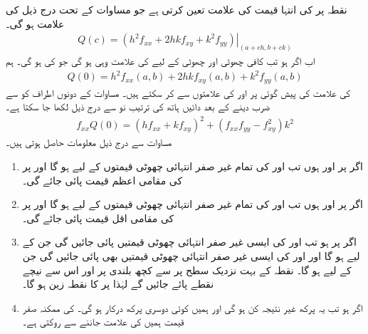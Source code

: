 نقطہ  پر  کی انتہا قیمت    کی علامت تعین کرتی ہے جو مساوات  کے تحت درج ذیل کی علامت ہو گی۔
\begin{align*}
Q(c)=\left. (h^2f_{xx}+2hkf_{xy}+k^2f_{yy})\right\vert_{(a+ch,b+ck)}
\end{align*}
اب اگر  ہو تب  کافی چھوٹی  اور  چھوٹی  کے لیے  کی علامت  وہی ہو گی جو  کی ہو گی۔ ہم
\begin{align}\label{مساوات_کثیرالمتغیر_ٹیلر_ت}
Q(0)=h^2f_{xx}(a,b)+2hkf_{xy}(a,b)+k^2f_{yy}(a,b)
\end{align}
کی علامت  کی پیش گوئی   پر  اور  کی علامتوں سے کر سکتے ہیں۔ مساوات  کے دونوں اطراف  کو  سے ضرب دینے کے بعد دائیں ہاتھ کی ترتیب نو سے درج ذیل لکھا جا سکتا ہے۔
\begin{align}\label{مساوات_کثیرالمتغیر_ٹیلر_ٹ}
f_{xx}Q(0)=(hf_{xx}+kf_{xy})^2+(f_{xx}f_{yy}-f_{xy}^2)k^2
\end{align}
مساوات  سے درج ذیل معلومات حاصل ہوتی ہیں۔
\begin{enumerate}[1.]
\item
اگر  پر  اور  ہوں تب  اور  کی تمام غیر صفر  انتہائی چھوٹی قیمتوں کے لیے    ہو گا  اور  پر  کی مقامی اعظم قیمت پائی جائے گی۔
\item
 اگر  پر  اور  ہوں تب  اور  کی تمام غیر صفر  انتہائی چھوٹی قیمتوں کے لیے    ہو گا  اور  پر  کی مقامی اقل   قیمت پائی جائے گی۔
\item
اگر  پر  ہو تب   اور  کی ایسی  غیر صفر انتہائی چھوٹی قیمتیں پائی جائیں گی جن کے لیے  ہو گا  اور    اور  کی ایسی  غیر صفر انتہائی چھوٹی قیمتیں بھی  پائی جائیں گی جن کے لیے  ہو گا۔ نقطہ  کے بہت نزدیک سطح  پر    سے  کچھ بلندی پر  اور اس سے نیچے نقطے پائے جائیں گے لہٰذا  پر  کا نقطہ زین ہو گا۔
\item
اگر  ہو تب یہ پرکھ غیر نتیجہ کن ہو گی اور ہمیں کوئی دوسری پرکھ درکار ہو گی۔  کی ممکنہ صفر قیمت ہمیں   کی علامت جاننے سے روکتی ہے۔ 
\end{enumerate}


